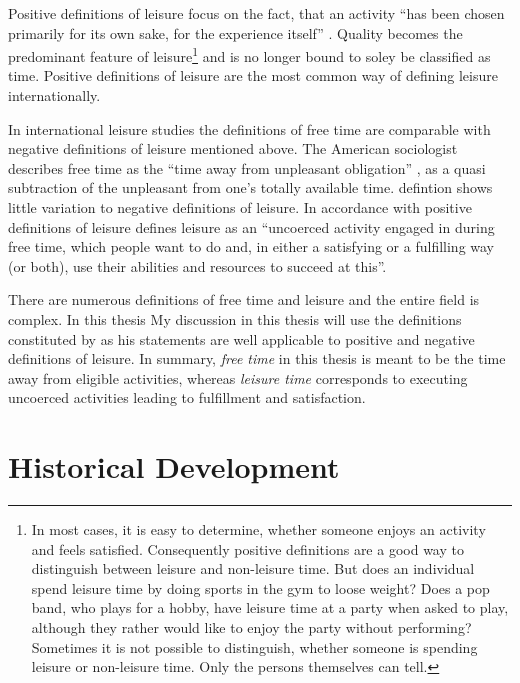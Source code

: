 \documentclass[12pt,numbers=noenddot,parskip,bibliography=totocnumbered,listof=totocnumbered]{scrreprt}
\begin{document}
Positive definitions of leisure focus on the fact, that an activity ``has been chosen primarily for its own sake, for the experience itself'' \citep[p.15]{freysinger2000}. Quality becomes the predominant feature of leisure\footnote{In most cases, it is easy to determine, whether someone enjoys an activity and feels satisfied. Consequently positive definitions are a good way to distinguish between leisure and non-leisure time. But does an individual spend leisure time by doing sports in the gym to loose weight? Does a pop band, who plays for a hobby, have leisure time at a party when asked to play, although they rather would like to enjoy the party without performing? Sometimes it is not possible to distinguish, whether someone is spending leisure or non-leisure time. Only the persons themselves can tell.}  and is no longer bound to soley be classified as time. Positive definitions of leisure are the most common way of defining leisure internationally.

In international leisure studies the definitions of free time are comparable with negative definitions of leisure mentioned above. The American sociologist \citeauthor{stebbins2007} describes free time as the ``time away from unpleasant obligation'' \cite[p.4]{stebbins2007}, as a quasi subtraction of the unpleasant from one's totally available time. \citeauthor{stebbins2007} defintion shows little variation to negative definitions of leisure. In accordance with positive definitions of leisure \citeauthor{stebbins2007} defines leisure as an ``uncoerced  activity engaged in during free time, which people want to do and, in either a satisfying or a fulfilling way (or both), use their abilities and resources to succeed at this''. 

There are numerous definitions of free time and leisure and the entire field is complex. In this thesis My discussion in this thesis will use the definitions constituted by \citeauthor{stebbins2007} as his statements are well applicable to positive and negative definitions of leisure. In summary, \textit{free time} in this thesis is meant to be the time away from eligible activities, whereas \textit{leisure time} corresponds to executing uncoerced activities leading to fulfillment and satisfaction.
 
\section{Historical Development} %
\end{document}
